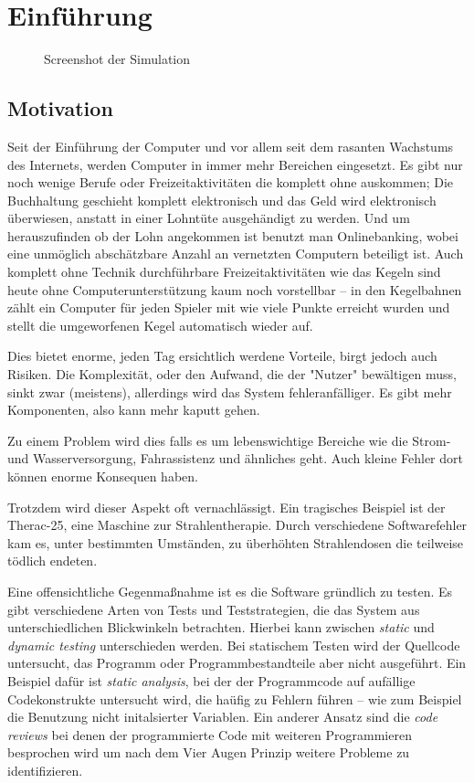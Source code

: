 \clearpage
\section{Einf{\"{u}}hrung}
\begin{figure}
	\centering
	\caption{Screenshot der Simulation}
	\label{fig:simulation}
\end{figure}

\subsection{Motivation} Seit der Einf{\"{u}}hrung der Computer und vor allem seit dem rasanten Wachstums des
Internets, werden Computer in immer mehr Bereichen eingesetzt. Es gibt nur noch wenige Berufe oder 
Freizeitaktivit{\"{a}}ten die komplett ohne auskommen; Die Buchhaltung geschieht komplett elektronisch und
das Geld wird elektronisch {\"{u}}berwiesen, anstatt in einer Lohnt{\"{u}}te ausgeh{\"{a}}ndigt zu werden.
Und um herauszufinden ob der Lohn angekommen ist benutzt man Onlinebanking, wobei eine
unm{\"{o}}glich absch{\"{a}}tzbare Anzahl an vernetzten Computern beteiligt ist. Auch komplett ohne Technik
durchf{\"{u}}hrbare Freizeitaktivit{\"{a}}ten wie das Kegeln sind heute ohne Computerunterst{\"{u}}tzung
kaum noch vorstellbar -- in den Kegelbahnen z{\"{a}}hlt ein Computer f{\"{u}}r jeden Spieler mit wie viele
Punkte erreicht wurden und stellt die umgeworfenen Kegel automatisch wieder auf.

Dies bietet enorme, jeden Tag ersichtlich werdene Vorteile, birgt jedoch auch Risiken. Die Komplexit{\"{a}}t,
oder den Aufwand, die der "Nutzer" bew{\"{a}}ltigen muss, sinkt zwar (meistens), allerdings wird das
System fehleranf{\"{a}}lliger. Es gibt mehr Komponenten, also kann mehr kaputt gehen.

Zu einem Problem wird dies falls es um lebenswichtige Bereiche wie die
Strom- und Wasserversorgung, Fahrassistenz und {\"{a}}hnliches geht. Auch kleine Fehler dort k{\"{o}}nnen
enorme Konsequen haben. 

Trotzdem wird dieser Aspekt oft vernachl{\"{a}}ssigt. Ein tragisches Beispiel ist der Therac-25, eine
Maschine zur Strahlentherapie. Durch verschiedene Softwarefehler kam es, unter bestimmten Umst{\"{a}}nden, zu
{\"{u}}berh{\"{o}}hten Strahlendosen die teilweise t{\"{o}}dlich endeten.

Eine offensichtliche Gegenma{\ss}nahme ist es die Software gr{\"{u}}ndlich zu testen. Es gibt verschiedene
Arten von Tests und Teststrategien, die das System aus unterschiedlichen Blickwinkeln betrachten. Hierbei kann zwischen
\textit{static} und \textit{dynamic testing} unterschieden werden. Bei statischem Testen wird der Quellcode untersucht,
das Programm oder Programmbestandteile aber nicht ausgef{\"{u}}hrt. Ein Beispiel daf{\"{u}}r ist \textit{static analysis},
bei der der Programmcode auf auf{\"{a}}llige Codekonstrukte untersucht wird, die ha{\"{u}}fig zu Fehlern f{\"{u}}hren -- wie zum
Beispiel die Benutzung nicht initalsierter Variablen. Ein anderer Ansatz sind die \textit{code reviews} bei
denen der programmierte Code mit weiteren Programmieren besprochen wird um nach dem Vier Augen Prinzip weitere Probleme zu
identifizieren. 

